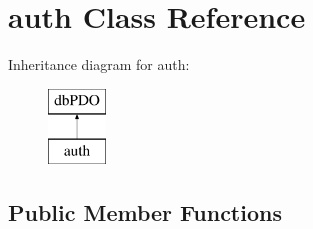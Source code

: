 \hypertarget{classauth}{\section{auth Class Reference}
\label{classauth}
}
Inheritance diagram for auth\-:\begin{figure}[H]
\begin{center}
\leavevmode
\includegraphics[height=2.000000cm]{classauth}
\end{center}
\end{figure}
\subsection*{Public Member Functions}
